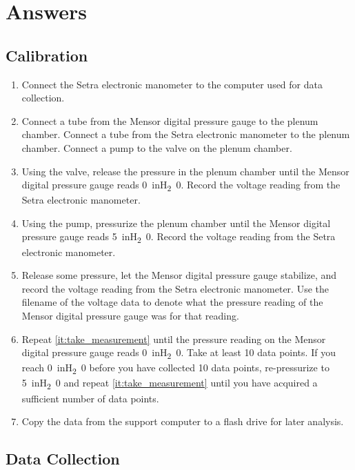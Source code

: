 \chapter{Answers}
\label{cp:answers}
\section{Calibration}

\begin{enumerate}
    \item Connect the Setra electronic manometer to the computer used for data collection.
    \item Connect a tube from the Mensor digital pressure gauge to the plenum chamber. Connect a tube from the Setra electronic manometer to the plenum chamber. Connect a pump to the valve on the plenum chamber.
    \item Using the valve, release the pressure in the plenum chamber until the Mensor digital pressure gauge reads \qty{0}{inH_20}. Record the voltage reading from the Setra electronic manometer.
    \item Using the pump, pressurize the plenum chamber until the Mensor digital pressure gauge reads \qty{5}{inH_20}. Record the voltage reading from the Setra electronic manometer.
    \item Release some pressure, let the Mensor digital pressure gauge stabilize, and record the voltage reading from the Setra electronic manometer. Use the filename of the voltage data to denote what the pressure reading of the Mensor digital pressure gauge was for that reading. \label{it:take_measurement}
    \item Repeat \autoref{it:take_measurement} until the pressure reading on the Mensor digital pressure gauge reads \qty{0}{inH_20}. Take at least \num{10} data points. If you reach \qty{0}{inH_20} before you have collected \num{10} data points, re-pressurize to \qty{5}{inH_20} and repeat \autoref{it:take_measurement} until you have acquired a sufficient number of data points.
    \item Copy the data from the support computer to a flash drive for later analysis.
\end{enumerate}

\section{Data Collection}


